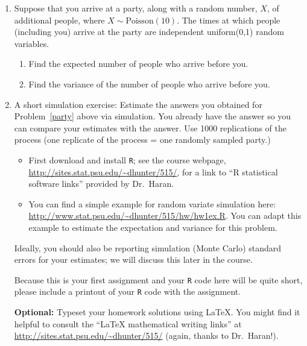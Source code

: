 \documentclass{article}
\begin{document}
\begin{enumerate}
  {\bf Hint:} The sum of independent geometric random variables with the same
  mean is negative binomial.

  \item\label{party} Suppose that you arrive at a party, along with a random
  number, $X$, of additional people, where $X\sim\mbox{Poisson}(10)$. The times
  at which people (including you) arrive at the party are independent
  uniform(0,1) random variables.

  \begin{enumerate}

    \item Find the expected number of people who arrive before you.

    \item Find the variance of the number of people who arrive before you.

  \end{enumerate}

  \item A short simulation exercise: Estimate the answers you obtained for
  Problem~\ref{party} above via simulation. You already have the answer so you
  can compare your estimates with the answer. Use 1000 replications of the
  process (one replicate of the process = one randomly sampled party.)

  \begin{itemize}

      \item First download and install {\tt R}; see the course webpage,
      \url{http://sites.stat.psu.edu/~dhunter/515/}, for a link to ``R
      statistical software links'' provided by Dr.~Haran.

      \item You can find a simple example for random variate simulation here:
      \url{http://www.stat.psu.edu/~dhunter/515/hw/hw1ex.R}. You can adapt this
      example to estimate the expectation and variance for this problem.

  \end{itemize}

  Ideally, you should also be reporting simulation (Monte Carlo) standard errors
  for your estimates; we will discuss this later in the course.

  Because this is your first assignment and your {\tt R} code here will be quite
  short, please include a printout of your {\tt R} code with the assignment.

  {\bf Optional: } Typeset your homework solutions using \LaTeX. You might find
  it helpful to consult the ``LaTeX mathematical writing links'' at
  \url{http://sites.stat.psu.edu/~dhunter/515/} (again, thanks to Dr.~Haran!).

\end{enumerate}
\end{document}
